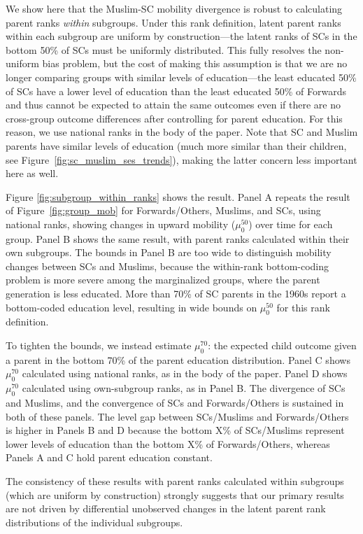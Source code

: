 We show here that the Muslim-SC mobility divergence is robust to calculating parent ranks \textit{within} subgroups. Under this rank definition, latent parent ranks within each subgroup are uniform by construction---the latent ranks of SCs in the bottom 50\% of SCs must be uniformly distributed. This fully resolves the non-uniform bias problem, but the cost of making this assumption is that we are no longer comparing groups with similar levels of education---the least educated 50\% of SCs have a lower level of education than the least educated 50\% of Forwards and thus cannot be expected to attain the same outcomes even if there are no cross-group outcome differences after controlling for parent education. For this reason, we use national ranks in the body of the paper. Note that SC and Muslim parents have similar levels of education (much more similar than their children, see Figure~\ref{fig:sc_muslim_ses_trends}), making the latter concern less important here as well.

Figure \ref{fig:subgroup_within_ranks} shows the result. Panel A repeats the result of Figure~\ref{fig:group_mob} for Forwards/Others, Muslims, and SCs, using national ranks, showing changes in upward mobility ($\mu_0^{50}$) over time for each group. Panel B shows the same result, with parent ranks calculated within their own subgroups. The bounds in Panel B are too wide to distinguish mobility changes between SCs and Muslims, because the within-rank bottom-coding problem is more severe among the marginalized groups, where the parent generation is less educated. More than 70\% of SC parents in the 1960s report a bottom-coded education level, resulting in wide bounds on $\mu_0^{50}$ for this rank definition. 

To tighten the bounds, we instead estimate $\mu_0^{70}$: the expected child outcome given a parent in the bottom 70\% of the parent education distribution. Panel C shows $\mu_0^{70}$ calculated using national ranks, as in the body of the paper. Panel D shows $\mu_0^{70}$ calculated using own-subgroup ranks, as in Panel B. The divergence of SCs and Muslims, and the convergence of SCs and Forwards/Others is sustained in both of these panels. The level gap between SCs/Muslims and Forwards/Others is higher in Panels B and D because the bottom X\% of SCs/Muslims represent lower levels of education than the bottom X\% of Forwards/Others, whereas Panels A and C hold parent education constant.

The consistency of these results with parent ranks calculated within subgroups (which are uniform by construction) strongly suggests that our primary results are not driven by differential unobserved changes in the latent parent rank distributions of the individual subgroups.

